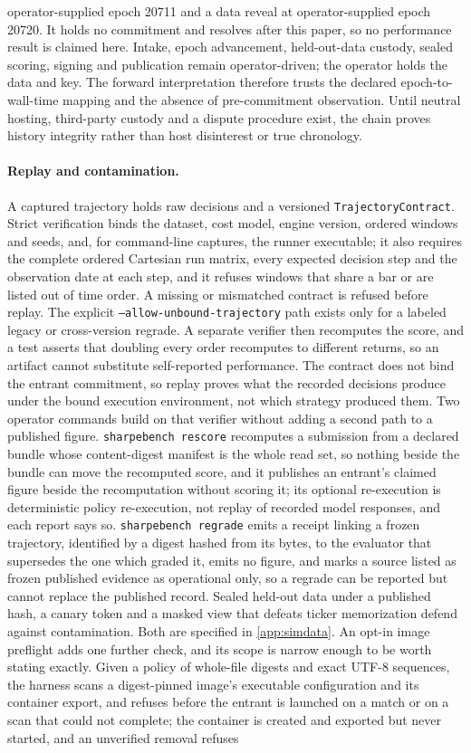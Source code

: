 operator-supplied epoch 20711 and a data reveal at operator-supplied epoch 20720. It holds no commitment and resolves after this paper, so no performance result is claimed here. Intake, epoch advancement, held-out-data custody, sealed scoring, signing and publication remain operator-driven; the operator holds the data and key. The forward interpretation therefore trusts the declared epoch-to-wall-time mapping and the absence of pre-commitment observation. Until neutral hosting, third-party custody and a dispute procedure exist, the chain proves history integrity rather than host disinterest or true chronology.

\paragraph{Replay and contamination.} A captured trajectory holds raw decisions and a versioned \texttt{TrajectoryContract}. Strict verification binds the dataset, cost model, engine version, ordered windows and seeds, and, for command-line captures, the runner executable; it also requires the complete ordered Cartesian run matrix, every expected decision step and the observation date at each step, and it refuses windows that share a bar or are listed out of time order. A missing or mismatched contract is refused before replay. The explicit \texttt{--allow-unbound-trajectory} path exists only for a labeled legacy or cross-version regrade. A separate verifier then recomputes the score, and a test asserts that doubling every order recomputes to different returns, so an artifact cannot substitute self-reported performance. The contract does not bind the entrant commitment, so replay proves what the recorded decisions produce under the bound execution environment, not which strategy produced them. Two operator commands build on that verifier without adding a second path to a published figure. \texttt{sharpebench rescore} recomputes a submission from a declared bundle whose content-digest manifest is the whole read set, so nothing beside the bundle can move the recomputed score, and it publishes an entrant's claimed figure beside the recomputation without scoring it; its optional re-execution is deterministic policy re-execution, not replay of recorded model responses, and each report says so. \texttt{sharpebench regrade} emits a receipt linking a frozen trajectory, identified by a digest hashed from its bytes, to the evaluator that supersedes the one which graded it, emits no figure, and marks a source listed as frozen published evidence as operational only, so a regrade can be reported but cannot replace the published record. Sealed held-out data under a published hash, a canary token and a masked view that defeats ticker memorization defend against contamination. Both are specified in \cref{app:simdata}. An opt-in image preflight adds one further check, and its scope is narrow enough to be worth stating exactly. Given a policy of whole-file digests and exact UTF-8 sequences, the harness scans a digest-pinned image's executable configuration and its container export, and refuses before the entrant is launched on a match or on a scan that could not complete; the container is created and exported but never started, and an unverified removal refuses 